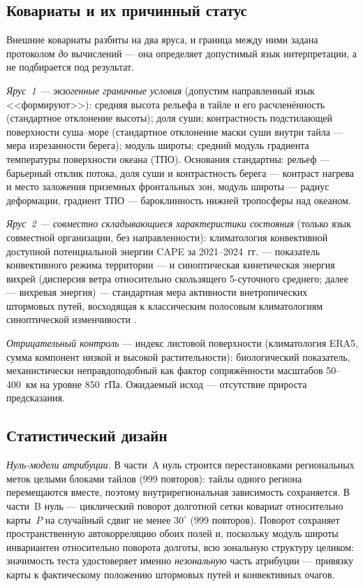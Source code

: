 \documentclass[11pt,a4paper]{article}
\begin{document}
\subsection{Ковариаты и их причинный статус}

Внешние ковариаты разбиты на два яруса, и граница между ними задана протоколом \emph{до} вычислений --- она определяет допустимый язык интерпретации, а не подбирается под результат.

\emph{Ярус~1 --- экзогенные граничные условия} (допустим направленный язык <<формируют>>): средняя высота рельефа в тайле и его расчленённость (стандартное отклонение высоты); доля суши; контрастность подстилающей поверхности суша--море (стандартное отклонение маски суши внутри тайла --- мера изрезанности берега); модуль широты; средний модуль градиента температуры поверхности океана (ТПО). Основания стандартны: рельеф --- барьерный отклик потока, доля суши и контрастность берега --- контраст нагрева и место заложения приземных фронтальных зон, модуль широты --- радиус деформации, градиент ТПО --- бароклинность нижней тропосферы над океаном.

\emph{Ярус~2 --- совместно складывающиеся характеристики состояния} (только язык совместной организации, без направленности): климатология конвективной доступной потенциальной энергии CAPE за 2021--2024~гг. \cite{RiemannCampe2009} --- показатель конвективного режима территории --- и синоптическая кинетическая энергия вихрей (дисперсия ветра относительно скользящего 5-суточного среднего; далее --- вихревая энергия) --- стандартная мера активности внетропических штормовых путей, восходящая к классическим полосовым климатологиям синоптической изменчивости \cite{Blackmon1976,HoskinsHodges2005,HoskinsHodges2019}.

\emph{Отрицательный контроль} --- индекс листовой поверхности (климатология ERA5, сумма компонент низкой и высокой растительности): биологический показатель, механистически неправдоподобный как фактор сопряжённости масштабов 50--400~км на уровне 850~гПа. Ожидаемый исход --- отсутствие прироста предсказания.

\subsection{Статистический дизайн}

\emph{Нуль-модели атрибуции.} В части~A нуль строится перестановками региональных меток целыми блоками тайлов (999 повторов): тайлы одного региона перемещаются вместе, поэтому внутрирегиональная зависимость сохраняется. В части~B нуль --- циклический поворот долготной сетки ковариат относительно карты~$P$ на случайный сдвиг не менее $30^\circ$ (999 повторов). Поворот сохраняет пространственную автокорреляцию обоих полей и, поскольку модуль широты инвариантен относительно поворота долготы, всю зональную структуру целиком: значимость теста удостоверяет именно \emph{незональную} часть атрибуции --- привязку карты к фактическому положению штормовых путей и конвективных очагов.
\end{document}
